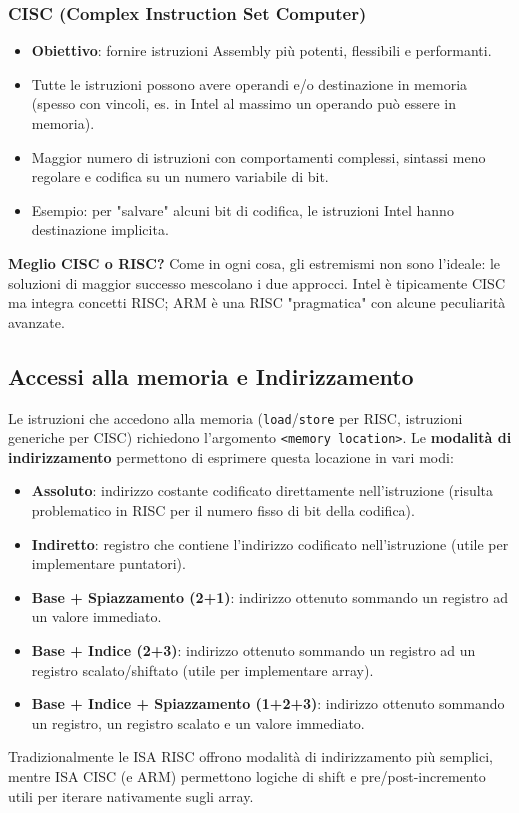 \documentclass[12pt, a4paper]{article}
\begin{document}
\subsubsection{CISC (Complex Instruction Set Computer)}
\begin{itemize}
    \item \textbf{Obiettivo}: fornire istruzioni Assembly più potenti, flessibili e performanti.
    \item Tutte le istruzioni possono avere operandi e/o destinazione in memoria (spesso con vincoli, es. in Intel al massimo un operando può essere in memoria).
    \item Maggior numero di istruzioni con comportamenti complessi, sintassi meno regolare e codifica su un numero variabile di bit.
    \item Esempio: per "salvare" alcuni bit di codifica, le istruzioni Intel hanno destinazione implicita.
\end{itemize}

\textbf{Meglio CISC o RISC?} Come in ogni cosa, gli estremismi non sono l'ideale: le soluzioni di maggior successo mescolano i due approcci. Intel è tipicamente CISC ma integra concetti RISC; ARM è una RISC "pragmatica" con alcune peculiarità avanzate.

\subsection{Accessi alla memoria e Indirizzamento}
Le istruzioni che accedono alla memoria (\texttt{load}/\texttt{store} per RISC, istruzioni generiche per CISC) richiedono l'argomento \texttt{<memory location>}. Le \textbf{modalità di indirizzamento} permettono di esprimere questa locazione in vari modi:
\begin{itemize}
    \item \textbf{Assoluto}: indirizzo costante codificato direttamente nell'istruzione (risulta problematico in RISC per il numero fisso di bit della codifica).
    \item \textbf{Indiretto}: registro che contiene l'indirizzo codificato nell'istruzione (utile per implementare puntatori).
    \item \textbf{Base + Spiazzamento (2+1)}: indirizzo ottenuto sommando un registro ad un valore immediato.
    \item \textbf{Base + Indice (2+3)}: indirizzo ottenuto sommando un registro ad un registro scalato/shiftato (utile per implementare array).
    \item \textbf{Base + Indice + Spiazzamento (1+2+3)}: indirizzo ottenuto sommando un registro, un registro scalato e un valore immediato.
\end{itemize}
Tradizionalmente le ISA RISC offrono modalità di indirizzamento più semplici, mentre ISA CISC (e ARM) permettono logiche di shift e pre/post-incremento utili per iterare nativamente sugli array.
\end{document}

